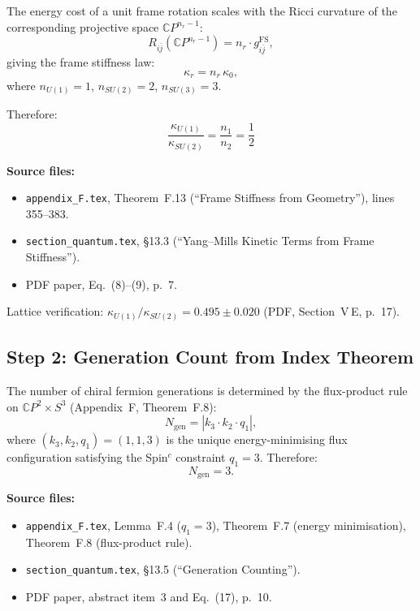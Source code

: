 \documentclass[11pt]{article}
\begin{document}
The energy cost of a unit frame rotation scales with the Ricci curvature
of the corresponding projective space $\mathbb{C}P^{n_r-1}$:
\[
  R_{i\bar{j}}(\mathbb{C}P^{n_r-1}) = n_r \cdot g_{i\bar{j}}^{\mathrm{FS}},
\]
giving the frame stiffness law:
\begin{equation}\label{eq:kappa}
\kappa_r = n_r\,\kappa_0,
\end{equation}
where $n_{U(1)}=1$, $n_{SU(2)}=2$, $n_{SU(3)}=3$.

Therefore:
\begin{equation}\label{eq:stiffness-ratio}
\boxed{\frac{\kappa_{U(1)}}{\kappa_{SU(2)}} = \frac{n_1}{n_2}
= \frac{1}{2}}
\end{equation}

\textbf{Source files:}
\begin{itemize}
\item \texttt{appendix\_F.tex}, Theorem~F.13 (``Frame Stiffness from Geometry''),
      lines 355--383.
\item \texttt{section\_quantum.tex}, \S13.3 (``Yang--Mills Kinetic Terms from
      Frame Stiffness'').
\item PDF paper, Eq.~(8)--(9), p.~7.
\end{itemize}

Lattice verification: $\kappa_{U(1)}/\kappa_{SU(2)} = 0.495 \pm 0.020$
(PDF, Section~V\,E, p.~17).

\subsection{Step 2: Generation Count from Index Theorem}

The number of chiral fermion generations is determined by the
flux-product rule on $\mathbb{C}P^2 \times S^3$
(Appendix~F, Theorem~F.8):
\[
  N_{\mathrm{gen}} = |k_3 \cdot k_2 \cdot q_1|,
\]
where $(k_3,k_2,q_1)=(1,1,3)$ is the unique energy-minimising flux
configuration satisfying the Spin$^c$ constraint $q_1=3$.
Therefore:
\begin{equation}\label{eq:Ngen}
\boxed{N_{\mathrm{gen}} = 3.}
\end{equation}

\textbf{Source files:}
\begin{itemize}
\item \texttt{appendix\_F.tex}, Lemma~F.4 ($q_1=3$), Theorem~F.7
      (energy minimisation), Theorem~F.8 (flux-product rule).
\item \texttt{section\_quantum.tex}, \S13.5 (``Generation Counting'').
\item PDF paper, abstract item~3 and Eq.~(17), p.~10.
\end{itemize}
\end{document}
